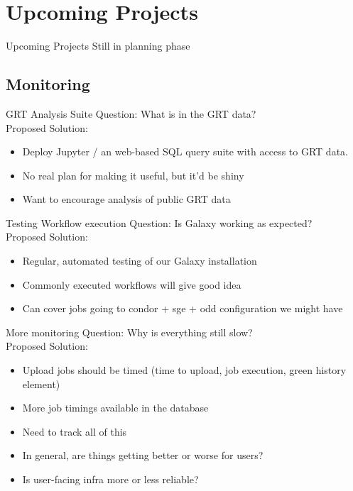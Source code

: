 \documentclass[12pt]{ufrslides}
\begin{document}
\section[Upcoming]{Upcoming Projects}
\begin{frame}{Upcoming Projects}
	Still in planning phase
\end{frame}

\subsection{Monitoring}

	\begin{frame}{GRT Analysis Suite}
		Question: What is in the GRT data? \\[0.6cm]
		Proposed Solution:
		\begin{itemize}
			\item Deploy Jupyter / an web-based SQL query suite with access to GRT data.
			\item No real plan for making it useful, but it'd be shiny
			\item Want to encourage analysis of public GRT data
		\end{itemize}
	\end{frame}

	\begin{frame}{Testing Workflow execution}
		Question: Is Galaxy working as expected? \\[0.6cm]
		Proposed Solution:
		\begin{itemize}
			\item Regular, automated testing of our Galaxy installation
			\item Commonly executed workflows will give good idea
			\item Can cover jobs going to condor + sge + odd configuration we might have
		\end{itemize}
	\end{frame}

	\begin{frame}{More monitoring}
		Question: Why is everything still slow? \\[0.6cm]
		Proposed Solution:
		\begin{itemize}
			\item Upload jobs should be timed (time to upload, job execution, green history element)
			\item More job timings available in the database
			\item Need to track all of this
			\item In general, are things getting better or worse for users?
			\item Is user-facing infra more or less reliable?
		\end{itemize}
	\end{frame}
\end{document}
